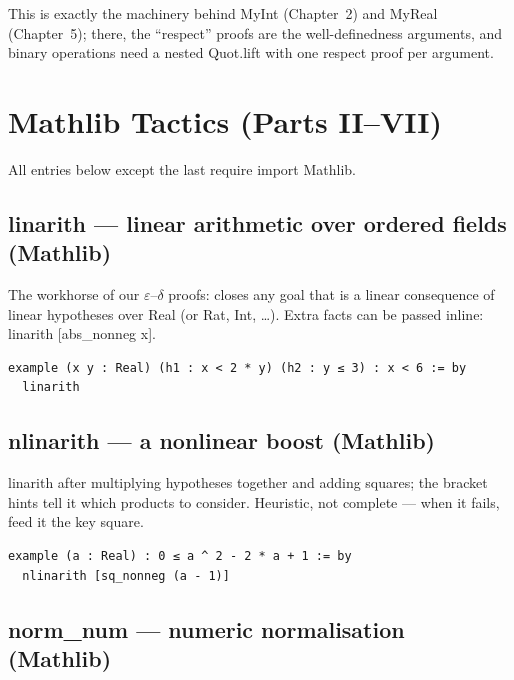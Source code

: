 \documentclass[12pt, openany]{book}
\theoremstyle{plain}
\theoremstyle{definition}
\theoremstyle{remark}
\newcommand{\li}[1]{{\ttfamily\small\color{tealaccent}#1}}
\begin{document}
This is exactly the machinery behind \li{MyInt} (Chapter~2) and \li{MyReal} (Chapter~5); there, the ``respect'' proofs are the well-definedness arguments, and binary operations need a nested \li{Quot.lift} with one respect proof per argument.

\section{Mathlib Tactics (Parts II--VII)}

All entries below except the last require \li{import Mathlib}.

\subsection*{\li{linarith} --- linear arithmetic over ordered fields \textbf{(Mathlib)}}

The workhorse of our $\varepsilon$--$\delta$ proofs: closes any goal that is a linear consequence of linear hypotheses over \li{Real} (or \li{Rat}, \li{Int}, \ldots).  Extra facts can be passed inline: \li{linarith [abs\_nonneg x]}.

\begin{leanbox}
\begin{lstlisting}
example (x y : Real) (h1 : x < 2 * y) (h2 : y ≤ 3) : x < 6 := by
  linarith
\end{lstlisting}
\end{leanbox}
\color{black}

\subsection*{\li{nlinarith} --- a nonlinear boost \textbf{(Mathlib)}}

\li{linarith} after multiplying hypotheses together and adding squares; the bracket hints tell it which products to consider.  Heuristic, not complete --- when it fails, feed it the key square.

\begin{leanbox}
\begin{lstlisting}
example (a : Real) : 0 ≤ a ^ 2 - 2 * a + 1 := by
  nlinarith [sq_nonneg (a - 1)]
\end{lstlisting}
\end{leanbox}
\color{black}

\subsection*{\li{norm\_num} --- numeric normalisation \textbf{(Mathlib)}}
\end{document}
